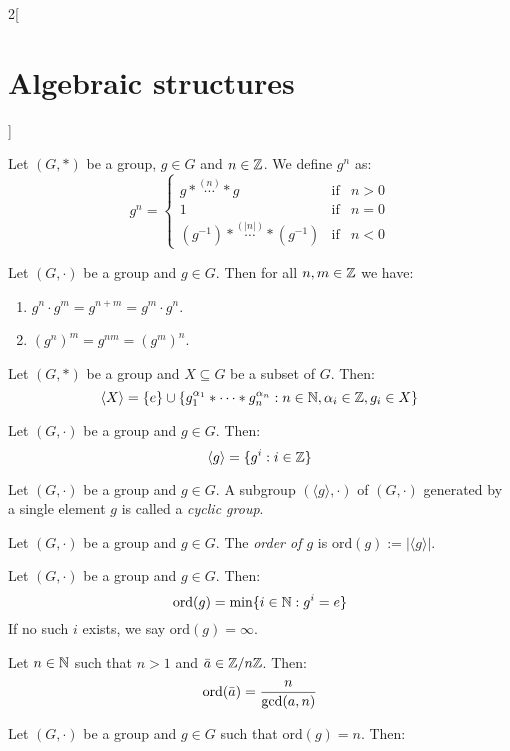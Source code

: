 \documentclass[../../../main.tex]{subfiles}
\begin{document}
\begin{multicols}{2}[\section{Algebraic structures}]
\begin{definition}
    Let $(G,*)$ be a group, $g\in G$ and $n\in\mathbb{Z} $. We define $g^n$ as: 
    $$g^n=\left\{
    \begin{array}{lll}
        g*\overset{(n)}{\cdots}* g & \text{if} & n>0  \\
        1 & \text{if} & n=0  \\
        (g^{-1})*\overset{(|n|)}{\cdots}*(g^{-1}) & \text{if} & n<0 
    \end{array}\right.$$
\end{definition}
\begin{lemma}
    Let $(G,\cdot)$ be a group and $g\in G$. Then for all $n,m\in\mathbb{Z} $ we have:
    \begin{enumerate}
        \item $g^n\cdot g^m=g^{n+m}=g^m\cdot g^n$.
        \item $(g^n)^m=g^{nm}=(g^m)^n$.
    \end{enumerate}
\end{lemma}
\begin{prop}
    Let $(G,*)$ be a group and $X\subseteq G$ be a subset of $G$. Then: $$\langle X\rangle=\{e\}\cup\{g_1^{\alpha_1}*\cdots* g_n^{\alpha_n}:n\in\mathbb{N} ,\alpha_i\in\mathbb{Z} ,g_i\in X\}$$
\end{prop}
\begin{corollary}
    Let $(G,\cdot)$ be a group and $g\in G$. Then: $$\langle g\rangle=\{g^i:i\in\mathbb{Z} \}$$
\end{corollary}
\begin{definition}
    Let $(G,\cdot)$ be a group and $g\in G$. A subgroup $(\langle g\rangle,\cdot)$ of $(G,\cdot)$ generated by a single element $g$ is called a \textit{cyclic group}.
\end{definition}
\begin{definition}
    Let $(G,\cdot)$ be a group and $g\in G$. The \textit{order of $g$} is $\text{ord}(g):=|\langle g\rangle|$.
\end{definition}
\begin{prop}
    Let $(G,\cdot)$ be a group and $g\in G$. Then: $$\text{ord}(g)=\min\{i\in\mathbb{N} :g^i=e\}$$
    If no such $i$ exists, we say $\text{ord}(g)=\infty$.
\end{prop}
\begin{corollary}
    Let $n\in\mathbb{N} $ such that $n>1$ and $\Bar{a}\in\mathbb{Z} /n\mathbb{Z} $. Then: $$\text{ord}(\Bar{a})=\frac{n}{\gcd(a,n)}$$
\end{corollary}
\begin{lemma}
    Let $(G,\cdot)$ be a group and $g\in G$ such that $\text{ord}(g)=n$. Then:

\end{lemma}
\end{multicols}
\end{document}
